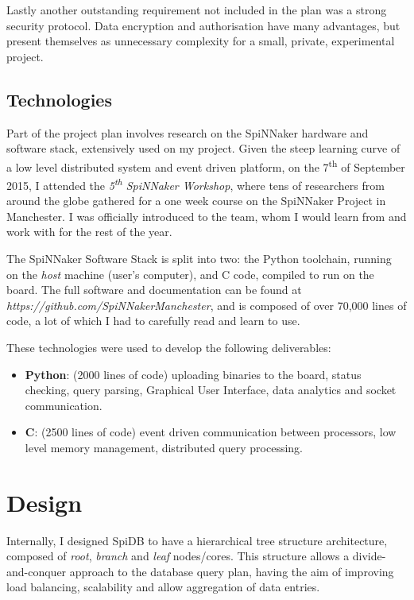 Lastly another outstanding requirement not included in the plan was a strong security protocol. Data encryption and authorisation have many advantages, but present themselves as unnecessary complexity for a small, private, experimental project.

\subsection{Technologies}
Part of the project plan involves research on the SpiNNaker hardware and software stack, extensively used on my project. Given the steep learning curve of a low level distributed system and event driven platform, on the 7\textsuperscript{th} of September 2015, I attended the \textit{5\textsuperscript{th} SpiNNaker Workshop}, where tens of researchers from around the globe gathered for a one week course on the SpiNNaker Project in Manchester. I was officially introduced to the team, whom I would learn from and work with for the rest of the year.

The SpiNNaker Software Stack is split into two: the Python toolchain, running on the \textit{host} machine (user's computer), and C code, compiled to run on the board. The full software and documentation can be found at \textit{https://github.com/SpiNNakerManchester}, and is composed of over 70,000 lines of code, a lot of which I had to carefully read and learn to use.

These technologies were used to develop the following deliverables:
\begin{itemize}
	\item \textbf{Python}: (2000 lines of code) uploading binaries to the board, status checking, query parsing, Graphical User Interface, data analytics and socket communication.
	\item \textbf{C}: (2500 lines of code) event driven communication between processors, low level memory management, distributed query processing.
\end{itemize}

\section{Design}
Internally, I designed SpiDB to have a hierarchical tree structure architecture, composed of \textit{root}, \textit{branch} and \textit{leaf} nodes/cores. This structure allows a divide-and-conquer approach to the database query plan, having the aim of improving load balancing, scalability and allow aggregation of data entries.

